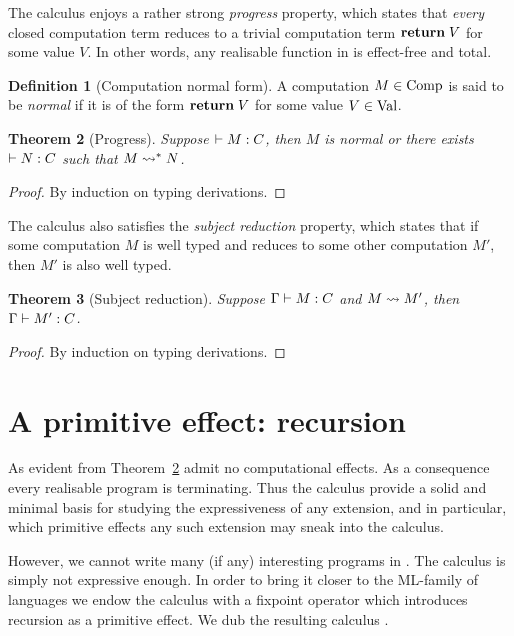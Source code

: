\documentclass[12pt,phd,lfcs,twoside,openright,logo,leftchapter,normalheadings]{infthesis}
\theoremstyle{plain}
\newtheorem{theorem}{Theorem}[chapter]
\newtheorem{corollary}[theorem]{Corollary}
\theoremstyle{definition}
\newtheorem{definition}[theorem]{Definition}
\begin{document}
%
The calculus enjoys a rather strong \emph{progress} property, which
states that \emph{every} closed computation term reduces to a trivial
computation term $\mathbf{return}\;V$ for some value $V$. In other words, any
realisable function in \BCalc{} is effect-free and total.
%
\begin{definition}[Computation normal form]\label{def:base-language-comp-normal}
  A computation $M \in \textrm{Comp}$ is said to be \emph{normal} if it is
  of the form $\mathbf{return}\; V$ for some value $V \in \textrm{Val}$.
\end{definition}
%
\begin{theorem}[Progress]\label{thm:base-language-progress}
  Suppose $\vdash M : C$, then $M$ is normal or there exists
  $\vdash N : C$ such that $M \leadsto^\ast N$.
\end{theorem}
%
\begin{proof}
  By induction on typing derivations.
\end{proof}
%
%
The calculus also satisfies the \emph{subject reduction} property,
which states that if some computation $M$ is well typed and reduces to
some other computation $M'$, then $M'$ is also well typed.
%
\begin{theorem}[Subject reduction]\label{thm:base-language-preservation}
  Suppose $\Gamma \vdash M : C$ and $M \leadsto M'$, then
  $\Gamma \vdash M' : C$.
\end{theorem}
%
\begin{proof}
  By induction on typing derivations.
\end{proof}

\section{A primitive effect: recursion}
\label{sec:base-language-recursion}
%
As evident from Theorem~\ref{thm:base-language-progress} \BCalc{}
admit no computational effects. As a consequence every realisable
program is terminating. Thus the calculus provide a solid and minimal
basis for studying the expressiveness of any extension, and in
particular, which primitive effects any such extension may sneak into
the calculus.

However, we cannot write many (if any) interesting programs in
\BCalc{}. The calculus is simply not expressive enough. In order to
bring it closer to the ML-family of languages we endow the calculus
with a fixpoint operator which introduces recursion as a primitive
effect. We dub the resulting calculus \BCalcRec{}.
%
\end{document}
